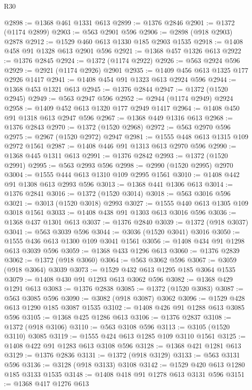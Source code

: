 \begin{lexlean}{R30}
\begin{coremodule}
@2898 := @1368 @461 @1331 @613
@2899 := @1376 @2846
@2901 := @1372 (@1174 @2899)
@2903 := @563 @2901 @596
@2906 := @2898 (@918 @2903) @2878
@2912 := @1529 @460 @613 @1330 @185 @2903 @1535
@2918 := @1408 @458 @91 @1328 @613 @2901 @596
@2921 := @1368 @457 @1326 @613
@2922 := @1376 @2845
@2924 := @1372 (@1174 @2922)
@2926 := @563 @2924 @596
@2929 := @2921 (@1174 @2926) @2901
@2935 := @1409 @456 @613 @1325 @177 @2926 @1417
@2941 := @1408 @454 @91 @1323 @613 @2924 @596
@2944 := @1368 @453 @1321 @613
@2945 := @1376 @2844
@2947 := @1372 (@1520 @2945)
@2949 := @563 @2947 @596
@2952 := @2944 (@1174 @2949) @2924
@2958 := @1409 @452 @613 @1320 @177 @2949 @1417
@2964 := @1408 @450 @91 @1318 @613 @2947 @596
@2967 := @1368 @449 @1316 @613
@2968 := @1376 @2843
@2970 := @1372 (@1520 @2968)
@2972 := @563 @2970 @596
@2975 := @2967 (@1520 @2972) @2947
@2981 := @1555 @448 @613 @1315 @109 @2972 @1561
@2987 := @1408 @446 @91 @1313 @613 @2970 @596
@2990 := @1368 @445 @1311 @613
@2991 := @1376 @2842
@2993 := @1372 (@1520 @2991)
@2995 := @563 @2993 @596
@2998 := @2990 (@1520 @2995) @2970
@3004 := @1555 @444 @613 @1310 @109 @2995 @1561
@3010 := @1408 @442 @91 @1308 @613 @2993 @596
@3013 := @1368 @441 @1306 @613
@3014 := @1376 @2841
@3016 := @1372 (@1520 @3014)
@3018 := @563 @3016 @596
@3021 := @3013 (@1520 @3018) @2993
@3027 := @1555 @440 @613 @1305 @109 @3018 @1561
@3033 := @1408 @438 @91 @1303 @613 @3016 @596
@3036 := @1368 @437 @1301 @613
@3037 := @1376 @2840
@3039 := @1372 (@918 @3037)
@3041 := @563 @3039 @596
@3044 := @3036 (@1520 @3041) @3016
@3050 := @1555 @436 @613 @1300 @109 @3041 @1561
@3056 := @1408 @434 @91 @1298 @613 @3039 @596
@3059 := @1368 @433 @1296 @613
@3060 := @1376 @2839
@3062 := @1372 (@918 @3060)
@3064 := @563 @3062 @596
@3067 := @3059 (@918 @3064) @3039
@3073 := @1529 @432 @613 @1295 @185 @3064 @1535
@3079 := @1408 @430 @91 @1293 @613 @3062 @596
@3082 := @1368 @429 @1291 @613
@3083 := @1376 @2838
@3085 := @1372 (@1520 @3083)
@3087 := @563 @3085 @596
@3090 := @3082 (@918 @3087) @3062
@3096 := @1529 @428 @613 @1290 @185 @3087 @1535
@3102 := @1408 @426 @91 @1288 @613 @3085 @596
@3105 := @1368 @425 @1286 @613
@3106 := @1376 @2837
@3108 := @1372 (@918 @3106)
@3110 := @563 @3108 @596
@3113 := @3105 (@1520 @3110) @3085
@3119 := @1555 @424 @613 @1285 @109 @3110 @1561
@3125 := @1408 @422 @91 @1283 @613 @3108 @596
@3128 := @1368 @421 @1281 @613
@3129 := @1376 @2836
@3131 := @1372 (@918 @3129)
@3133 := @563 @3131 @596
@3136 := @3128 (@918 @3133) @3108
@3142 := @1529 @420 @613 @1280 @185 @3133 @1535
@3148 := @1408 @418 @91 @1278 @613 @3131 @596
@3151 := @1368 @417 @1276 @613

\end{coremodule}
\end{lexlean}
